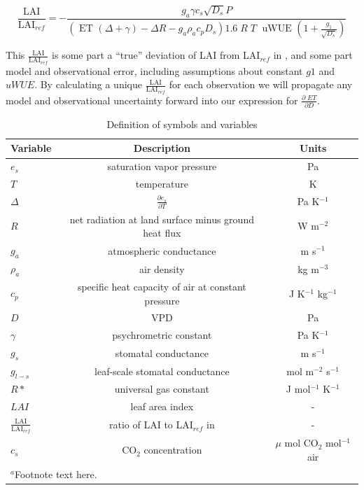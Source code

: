 \documentclass[draft,linenumbers]{agujournal}
\begin{document}
\begin{linenomath*}
  \begin{equation}
    \frac{\text{LAI}}{\text{LAI$_{ref}$}}  = - \frac{g_a \gamma c_s \sqrt{D_s} P }{ \left(\text{ ET } ( \Delta + \gamma) - \Delta R - g_a \rho_a c_p D_{s}\right) 1.6 \; R\; T\; \text{ uWUE } (1 + \frac{g_1}{\sqrt{D_s}})}
    \label{lai}
  \end{equation}
\end{linenomath*}

This $\frac{\text{LAI}}{\text{LAI$_{ref}$}}$ is some part a ``true'' deviation of  LAI from LAI$_{ref}$ in \citet{Zhou_2015}, and some part model and observational error, including assumptions about constant $g1$ and $uWUE$. By calculating a unique $\frac{\text{LAI}}{\text{LAI$_{ref}$}}$ for each observation we will propagate any model and observational uncertainty forward into our expression for $\frac{\partial \; ET}{\partial D}$. 


\begin{table}
\caption{Definition of symbols and variables}
\centering
\begin{tabular}{l c c}
\hline
 Variable & Description & Units  \\
\hline
$e_s$  & saturation vapor pressure & Pa  \\ 
$T$  & temperature  & K \\
$\Delta$  & $\frac{\partial e_s}{\partial T}$ & Pa K$^{-1}$ \\
$R$  & net radiation at land surface minus ground heat flux & W m$^{-2}$   \\
  $g_a$  & atmospheric conductance & m s$^{-1}$  \\
  $\rho_a$  & air density & kg m$^{-3}$  \\
  $c_p$  & specific heat capacity of air at constant pressure & J K$^{-1}$ kg$^{-1}$ \\
  $D$  & VPD & Pa  \\
  $\gamma$  & psychrometric constant & Pa K$^{-1}$   \\
  $g_s$  & stomatal conductance & m s$^{-1}$  \\
  $g_{l-s}$  & leaf-scale stomatal conductance & mol m$^{-2}$ s$^{-1}$  \\
  $R*$ & universal gas constant & J mol$^{-1}$ K$^{-1}$ \\
  $LAI$ & leaf area index & -\\
  $\frac{\text{LAI}}{\text{LAI$_{ref}$}}$ & ratio of LAI to LAI$_{ref}$ in \citet{Zhou_2015} & -\\
  $c_s$ & CO$_2$ concentration & $\mu$ mol CO$_2$ mol$^{-1}$ air\\
\hline
\multicolumn{2}{l}{$^{a}$Footnote text here.}
\end{tabular}
\end{table}
\end{document}
